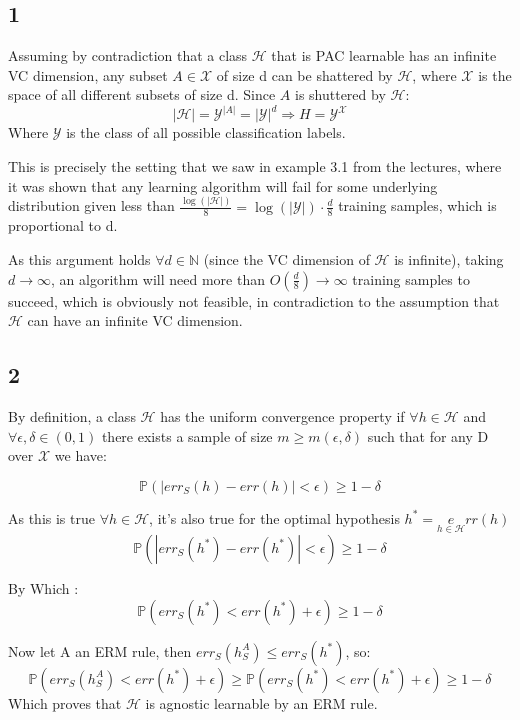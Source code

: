\subsection*{1}
Assuming by contradiction that a class $\mathcal{H}$ that is PAC learnable has an infinite VC dimension, any subset $A \in \mathcal{X}$ of size d can be shattered by $\mathcal{H}$, where $\mathcal{X}$ is the space of all different subsets of size d. Since $A$ is shuttered by $\mathcal{H}$:
\begin{equation*}
    |\mathcal{H}| = \mathcal{Y}^|A| = |\mathcal{Y}|^d \Rightarrow H = \mathcal{Y}^\mathcal{X}
\end{equation*}
Where $\mathcal{Y}$ is the class of all possible classification labels.

This is precisely the setting that we saw in example 3.1 from the lectures, where it was shown that any learning algorithm will fail for some underlying distribution given less than $\frac{\log (|\mathcal{H}|)}{8} = \log(|\mathcal{Y}|) \cdot \frac{d}{8}$ training samples, which is proportional to d.

As this argument holds $\forall d \in \mathbb{N}$ (since the VC dimension of $\mathcal{H}$ is infinite), taking $d\rightarrow \infty$, an algorithm will need more than $O(\frac{d}{8}) \rightarrow \infty$ training samples to succeed, which is obviously not feasible, in contradiction to the assumption that $\mathcal{H}$ can have an infinite VC dimension.

\subsection*{2}
By definition, a class $\mathcal{H}$ has the uniform convergence property if $\forall h \in \mathcal{H}$ and $\forall \epsilon, \delta \in (0, 1)$ there exists a sample of size $m \geq m(\epsilon, \delta)$ such that for any D over $\mathcal{X}$ we have:

\begin{equation*}
    \mathbb{P}(|err_S(h) - err(h)| < \epsilon) \geq 1-\delta
\end{equation*}

As this is true $\forall h \in \mathcal{H}$, it's also true for the optimal hypothesis $h^* = \underset{h \in \mathcal{H}} err(h)$
\begin{equation*}
    \mathbb{P}(|err_S(h^*) - err(h^*)| < \epsilon) \geq 1-\delta
\end{equation*}

By Which :
\begin{equation*}
    \mathbb{P}(err_S(h^*) < err(h^*) + \epsilon) \geq 1-\delta
\end{equation*}

Now let A an ERM rule, then $err_S(h_S^A) \leq err_S(h^*)$, so:
\begin{equation*}
    \mathbb{P}(err_S(h_S^A) < err(h^*) + \epsilon) \geq \mathbb{P}(err_S(h^*) < err(h^*) + \epsilon) \geq 1-\delta
\end{equation*}
Which proves that $\mathcal{H}$ is agnostic learnable by an ERM rule.
